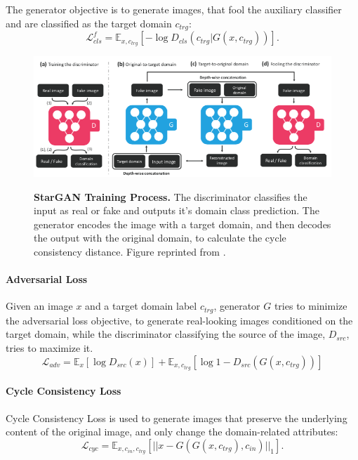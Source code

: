 \documentclass[12pt]{report}
\begin{document}
The generator objective is to generate images, that fool the auxiliary classifier and are classified as the target domain $c_{trg}$:
\begin{equation}
\mathcal{L}^{f}_{cls} = \mathbb{E}_{x,c_{trg}}[-\log D_{cls}(c_{trg}|G(x, c_{trg}))].
\label{eq:stargan_clsf}
\end{equation}

\begin{figure}[h]
\centering
{\includegraphics[width=\linewidth]{03_analysis/gans/stargan}}
\caption{\label{fig:stargan_training} \textbf{StarGAN Training Process.} The discriminator classifies the input as real or fake and outputs it's domain class prediction. The generator encodes the image with a target domain, and then decodes the output with the original domain, to calculate the cycle consistency distance. Figure reprinted from \cite{choi_stargan_2017}.}
\end{figure}

\paragraph{Adversarial Loss}
Given an image $x$ and a target domain label $c_{trg}$, generator $G$ tries to minimize the adversarial loss objective, to generate real-looking images conditioned on the target domain, while the discriminator classifying the source of the image, $D_{src}$, tries to maximize it.
\begin{equation}
\mathcal{L}_{adv} = \mathbb{E}_{x}[\log D_{src}(x)] + \mathbb{E}_{x, c_{trg}}[\log 1 - D_{src}(G(x, c_{trg}))]
\label{eq:stargan_adv}
\end{equation}

\paragraph{Cycle Consistency Loss}
Cycle Consistency Loss \cite{zhu_unpaired_2017} is used to generate images that preserve the underlying content of the original image, and only change the domain-related attributes:
\begin{equation}
\mathcal{L}_{cyc} = \mathbb{E}_{x,c_{in},c_{trg}}[||x - G(G(x,c_{trg}), c_{in})||_{1}].
\label{eq:stargan_cyc}
\end{equation}
\end{document}

